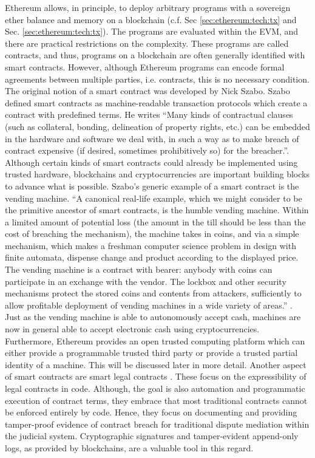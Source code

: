 Ethereum allows, in principle, to deploy arbitrary programs with a sovereign ether balance and memory on a blockchain (c.f. Sec \ref{sec:ethereum:tech:tx} and Sec. \ref{sec:ethereum:tech:tx}). The programs are evaluated within the \ac{EVM}, and there are practical restrictions on the complexity. These programs are called contracts, and thus, programs on a blockchain are often generally identified with smart contracts. However, although Ethereum programs can encode formal agreements between multiple parties, i.e. contracts, this is no necessary condition.
The original notion of a smart contract was developed by Nick Szabo. Szabo defined smart contracts as machine-readable transaction protocols which create a contract with predefined terms. He writes “Many kinds of contractual clauses (such as collateral, bonding, delineation of property rights, etc.) can be embedded in the hardware and software we deal with, in such a way as to make breach of contract expensive (if desired, sometimes prohibitively so) for the breacher.”.  Although certain kinds of smart contracts could already be implemented using trusted hardware, blockchains and cryptocurrencies are important building blocks to advance what is possible. Szabo’s generic example of a smart contract is the vending machine. 
“A canonical real-life example, which we might consider to be the primitive ancestor of smart contracts, is the humble vending machine. Within a limited amount of potential loss (the amount in the till should be less than the cost of breaching the mechanism), the machine takes in coins, and via a simple mechanism, which makes a freshman computer science problem in design with finite automata, dispense change and product according to the displayed price. The vending machine is a contract with bearer: anybody with coins can participate in an exchange with the vendor. The lockbox and other security mechanisms protect the stored coins and contents from attackers, sufficiently to allow profitable deployment of vending machines in a wide variety of areas.” \parencite{szabo1997}. Just as the vending machine is able to autonomously accept cash, machines are now in general able to accept electronic cash using cryptocurrencies.  Furthermore, Ethereum provides an open trusted computing platform which can either provide a programmable trusted third party or provide a trusted partial identity of a machine. This will be discussed later in more detail. Another aspect of smart contracts are smart legal contracts \parencite{1319505,DBLP:journals/corr/ClackBB16}. These focus on the expressibility of legal contracts in code. Although, the goal is also automation and programmatic execution of contract terms, they embrace that most traditional contracts cannot be enforced entirely by code. Hence, they focus on documenting and providing tamper-proof evidence of contract breach for traditional dispute mediation within the judicial system. Cryptographic signatures and tamper-evident append-only logs, as provided by blockchains, are a valuable tool in this regard.

